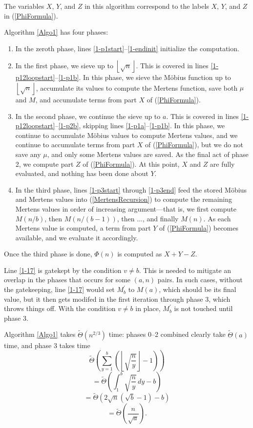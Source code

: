 \documentclass[12pt]{article}
\newcommand{\eqn}[1]{\begin{displaymath} #1 \end{displaymath}}
\newcommand{\floor}[1]{{\left\lfloor #1 \right\rfloor}}
\newcommand{\integral}[4]{\displaystyle\int_{#3}^{#4} \! #1 \, d#2}
\newcommand{\eval}[3]{\left. #1 \right|_{#2}^{#3}}
\newcommand{\isqrt}[1]{\floor{\sqrt{#1}}}
\newcommand{\softTheta}[0]{\widetilde{\Theta}}
\begin{document}
The variables $X$, $Y$, and $Z$ in this algorithm correspond to the labels $X$, $Y$, and $Z$ in (\ref{PhiFormula}).

Algorithm \ref{Algo1} has four phases:
\begin{enumerate} \addtocounter{enumi}{-1}
\item In the zeroth phase, lines \ref{1-p1start}--\ref{1-endinit} initialize the computation.
\item In the first phase, we sieve up to $\isqrt{n}$.  This is covered in lines \ref{1-p12loopstart}--\ref{1-p1b}.  In this phase, we sieve the M\"{o}bius function up to $\isqrt{n}$, accumulate its values to compute the Mertens function, save both $\mu$ and $M$, and accumulate terms from part $X$ of (\ref{PhiFormula}).
\item In the second phase, we continue the sieve up to $a$.  This is covered in lines \ref{1-p12loopstart}--\ref{1-p2b}, skipping lines \ref{1-p1a}--\ref{1-p1b}.  In this phase, we continue to accumulate M\"{o}bius values to compute Mertens values, and we continue to accumulate terms from part $X$ of (\ref{PhiFormula}), but we do not save any $\mu$, and only some Mertens values are saved.  As the final act of phase 2, we compute part $Z$ of (\ref{PhiFormula}).  At this point, $X$ and $Z$ are fully evaluated, and nothing has been done about $Y$.
\item In the third phase, lines \ref{1-p3start} through \ref{1-p3end} feed the stored M\"{o}bius and Mertens values into (\ref{MertensRecursion}) to compute the remaining Mertens values in order of increasing argument---that is, we first compute $M(n/b)$, then $M(n/(b-1))$, then ..., and finally $M(n)$.  As each Mertens value is computed, a term from part $Y$ of (\ref{PhiFormula}) becomes available, and we evaluate it accordingly.
\end{enumerate}
Once the third phase is done, $\Phi(n)$ is computed as $X+Y-Z$.

Line \ref{1-17} is gatekept by the condition $v \neq b$.  This is needed to mitigate an overlap in the phases that occurs for some $(a,n)$ pairs.  In such cases, without the gatekeeping, line \ref{1-17} would set $M^\prime_b$ to $M(a)$, which should be its final value, but it then gets modifed in the first iteration through phase 3, which throws things off.  With the condition $v \neq b$ in place, $M^\prime_b$ is not touched until phase 3.

Algorithm \ref{Algo1} takes $\softTheta(n^{2/3})$ time: phases 0--2 combined clearly take $\softTheta(a)$ time, and phase 3 takes time
\eqn{\softTheta \left( \sum_{y=1}^b \left( \isqrt{\frac{n}{y}} - 1 \right) \right)}
\eqn{= \softTheta \left( \integral{ \sqrt{\frac{n}{y}} }{y}{1}{b} - b \right)}
\eqn{= \softTheta \left( 2 \sqrt{n} \left( \sqrt{b} - 1 \right) - b \right)}
\eqn{= \softTheta \left( \frac{n}{\sqrt{a}} \right).}
\end{document}
